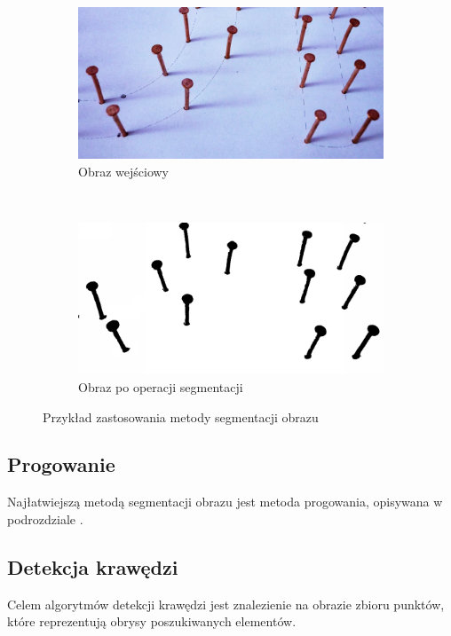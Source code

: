 \begin{figure}
  \centering
  \begin{subfigure}[b]{0.48\textwidth}
    \includegraphics[width=\textwidth]{img/gwozdzie-input}
    \caption{Obraz wejściowy}
    \label{fig:gwozdzie_input}
  \end{subfigure}
  ~
  \begin{subfigure}[b]{0.48\textwidth}
    \includegraphics[width=\textwidth]{img/gwozdzie-output}
    \caption{Obraz po operacji segmentacji}
    \label{fig:gwozdzie_output}
  \end{subfigure}
  \caption{Przykład zastosowania metody segmentacji obrazu}\label{fig:gwozdzie}
\end{figure}

\subsection{Progowanie}
Najłatwiejszą metodą segmentacji obrazu jest metoda progowania, opisywana w podrozdziale .

\subsection{Detekcja krawędzi}
Celem algorytmów detekcji krawędzi jest znalezienie na obrazie zbioru punktów, które reprezentują obrysy poszukiwanych elementów. 

